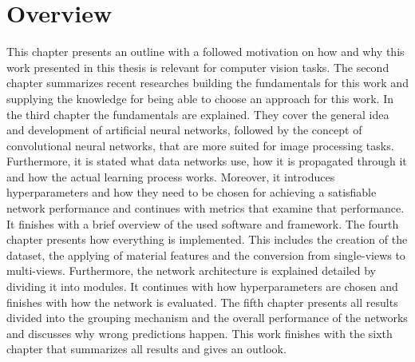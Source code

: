 \section{Overview}
\label{sec:overview}
This chapter presents an outline with a followed motivation on how and why this work presented in this thesis is relevant for computer vision tasks.
The second chapter summarizes recent researches building the fundamentals for this work and supplying the knowledge for being able to choose an approach for this work.
In the third chapter the fundamentals are explained.
They cover the general idea and development of artificial neural networks, followed by the concept of convolutional neural networks, that are more suited for image processing tasks.
Furthermore, it is stated what data networks use, how it is propagated through it and how the actual learning process works.
Moreover, it introduces hyperparameters and how they need to be chosen for achieving a satisfiable network performance and continues with metrics that examine that performance.
It finishes with a brief overview of the used software and framework.
The fourth chapter presents how everything is implemented.
This includes the creation of the dataset, the applying of material features and the conversion from single-views to multi-views.
Furthermore, the network architecture is explained detailed by dividing it into modules.
It continues with how hyperparameters are chosen and finishes with how the network is evaluated.
The fifth chapter presents all results divided into the grouping mechanism and the overall performance of the networks and discusses why wrong predictions happen.
This work finishes with the sixth chapter that summarizes all results and gives an outlook.